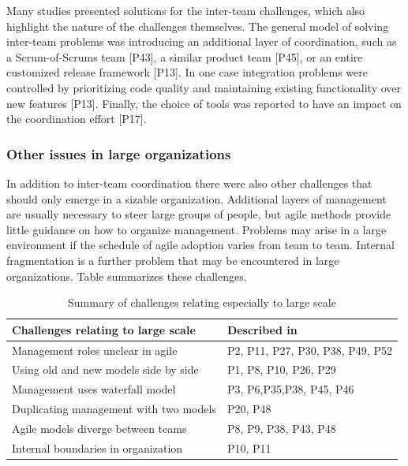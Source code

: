 \documentclass[preprint,authoryear,12pt]{elsarticle}
\begin{document}
Many studies presented solutions for the inter-team challenges, which also
highlight the nature of the challenges themselves. The general model of solving
inter-team problems was introducing an additional layer of coordination, such as
a Scrum-of-Scrums team [P43], a similar product team [P45], or an entire
customized release framework [P13]. In one case integration problems were
controlled by prioritizing code quality and maintaining existing functionality
over new features [P13]. Finally, the choice of tools was reported to have an
impact on the coordination effort [P17].



\subsubsection{Other issues in large organizations}

In addition to inter-team coordination there were also other challenges that
should only emerge in a sizable organization.
Additional layers of management are usually necessary to steer large groups of
people, but agile methods provide little guidance on how to organize management.
Problems may arise in a large environment if the schedule of agile adoption
varies from team to team. Internal fragmentation is a further problem that may
be encountered in large organizations.
Table \label{table:challenges_largescale} summarizes these challenges.

\begin{table}[b]
    \centering
    \begin{tabular}{ >{\raggedright\arraybackslash}p{}
                     >{\raggedright\arraybackslash}p{} }
        \toprule
        Challenges relating to large scale  &  Described in \\
        \midrule
        Management roles unclear in agile       &  P2, P11, P27, P30, P38, P49, P52 \\
        Using old and new models side by side   &  P1, P8, P10, P26, P29 \\
        Management uses waterfall model         &  P3, P6,P35,P38, P45, P46  \\
        Duplicating management with two models  &  P20, P48 \\
        Agile models diverge between teams      &  P8, P9, P38, P43, P48 \\
        Internal boundaries in organization     &  P10, P11 \\
        \bottomrule
    \end{tabular}
    \caption{Summary of challenges relating especially to large scale}
    \label{table:challenges_largescale}
\end{table}
\end{document}

